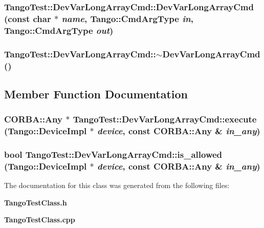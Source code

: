 \subsubsection{\setlength{\rightskip}{0pt plus 5cm}Tango\-Test::Dev\-Var\-Long\-Array\-Cmd::Dev\-Var\-Long\-Array\-Cmd (const char $\ast$ {\em name}, Tango::Cmd\-Arg\-Type {\em in}, Tango::Cmd\-Arg\-Type {\em out})}\label{classTangoTest_1_1DevVarLongArrayCmd_a1}


\subsubsection{\setlength{\rightskip}{0pt plus 5cm}Tango\-Test::Dev\-Var\-Long\-Array\-Cmd::$\sim$Dev\-Var\-Long\-Array\-Cmd ()\hspace{0.3cm}{\tt  [inline]}}\label{classTangoTest_1_1DevVarLongArrayCmd_a2}




\subsection{Member Function Documentation}
\subsubsection{\setlength{\rightskip}{0pt plus 5cm}CORBA::Any $\ast$ Tango\-Test::Dev\-Var\-Long\-Array\-Cmd::execute (Tango::Device\-Impl $\ast$ {\em device}, const CORBA::Any \& {\em in\_\-any})\hspace{0.3cm}{\tt  [virtual]}}\label{classTangoTest_1_1DevVarLongArrayCmd_a4}


\subsubsection{\setlength{\rightskip}{0pt plus 5cm}bool Tango\-Test::Dev\-Var\-Long\-Array\-Cmd::is\_\-allowed (Tango::Device\-Impl $\ast$ {\em device}, const CORBA::Any \& {\em in\_\-any})\hspace{0.3cm}{\tt  [virtual]}}\label{classTangoTest_1_1DevVarLongArrayCmd_a3}




The documentation for this class was generated from the following files:\begin{CompactItemize}
\item 
{\bf Tango\-Test\-Class.h}\item 
{\bf Tango\-Test\-Class.cpp}\end{CompactItemize}
